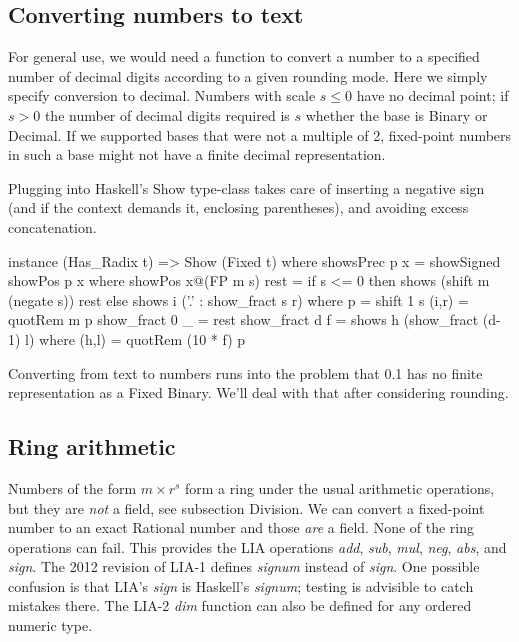 \documentclass{article}
\begin{document}
\begin{code}

\subsection{Converting numbers to text}

For general use, we would need a function to convert a
number to a specified number of decimal digits according
to a given rounding mode.  Here we simply specify conversion
to decimal.  Numbers with scale $s \le 0$ have no decimal
point; if $s > 0$ the number of decimal digits required is
$s$ whether the base is Binary or Decimal.  If we supported
bases that were not a multiple of 2, fixed-point numbers in
such a base might not have a finite decimal representation.

Plugging into Haskell's Show type-class takes care of
inserting a negative sign (and if the context demands it,
enclosing parentheses), and avoiding excess concatenation.

\begin{code}
instance (Has_Radix t) => Show (Fixed t)
  where
    showsPrec p x = showSigned showPos p x
      where showPos x@(FP m s) rest =
              if s <= 0 then shows (shift m (negate s)) rest
              else shows i ('.' : show_fract s r)
              where p = shift 1 s
                    (i,r) = quotRem m p
                    show_fract 0 _ = rest
                    show_fract d f = shows h (show_fract (d-1) l)
                      where (h,l) = quotRem (10 * f) p
\end{code}

Converting from text to numbers runs into the problem that
0.1 has no finite representation as a Fixed Binary.
We'll deal with that after considering rounding.

\subsection{Ring arithmetic}

Numbers of the form $m\times r^s$ form a ring under the usual
arithmetic operations, but they are \emph{not} a field, see
subsection Division.
We can convert a fixed-point number to an exact Rational number and
those \emph{are} a field.  None of the ring operations can fail.
This provides the LIA operations {\it add}, {\it sub}, {\it mul},
{\it neg}, {\it abs}, and {\it sign}.  The 2012 revision of LIA-1
defines {\it signum} instead of {\it sign}.  One possible confusion
is that LIA's {\it sign} is Haskell's {\it signum}; testing is
advisible to catch mistakes there.  The LIA-2 {\it dim}
function can also be defined for any ordered numeric type.


\end{code}
\end{document}
